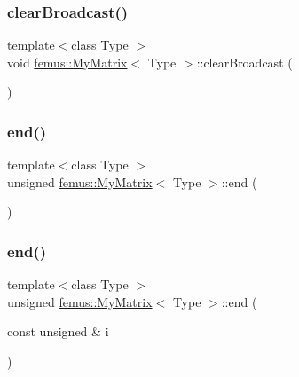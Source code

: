 \mbox{\label{classfemus_1_1_my_matrix_ab466c235f5d88ec88c493119f77be25c}} 
\subsubsection{\texorpdfstring{clear\+Broadcast()}{clearBroadcast()}}
{\footnotesize\ttfamily template$<$class Type $>$ \\
void \mbox{\hyperlink{classfemus_1_1_my_matrix}{femus\+::\+My\+Matrix}}$<$ Type $>$\+::clear\+Broadcast (\begin{DoxyParamCaption}{ }\end{DoxyParamCaption})}

\mbox{\label{classfemus_1_1_my_matrix_adc8f45533d3acaab710e0569a152459e}} 
\subsubsection{\texorpdfstring{end()}{end()}\hspace{0.1cm}{\footnotesize\ttfamily [1/2]}}
{\footnotesize\ttfamily template$<$class Type $>$ \\
unsigned \mbox{\hyperlink{classfemus_1_1_my_matrix}{femus\+::\+My\+Matrix}}$<$ Type $>$\+::end (\begin{DoxyParamCaption}{ }\end{DoxyParamCaption})}

\mbox{\label{classfemus_1_1_my_matrix_a6da3c82decd250ee84e7692c40880ec9}} 
\subsubsection{\texorpdfstring{end()}{end()}\hspace{0.1cm}{\footnotesize\ttfamily [2/2]}}
{\footnotesize\ttfamily template$<$class Type $>$ \\
unsigned \mbox{\hyperlink{classfemus_1_1_my_matrix}{femus\+::\+My\+Matrix}}$<$ Type $>$\+::end (\begin{DoxyParamCaption}\item[{const unsigned \&}]{i }\end{DoxyParamCaption})}

